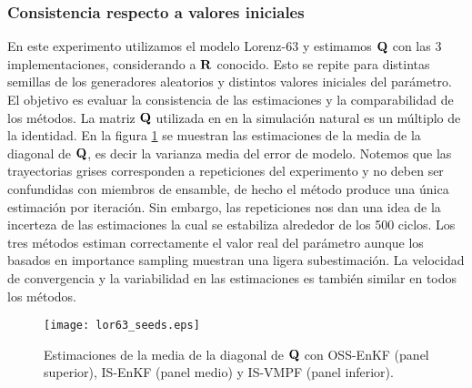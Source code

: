 \subsubsection{Consistencia respecto a valores iniciales}
En este experimento utilizamos el modelo Lorenz-63 y estimamos $\mathbf{Q}$ con las 3 implementaciones, considerando a $\mathbf{R}$ conocido. Esto se repite para distintas semillas de los generadores aleatorios y distintos valores iniciales del parámetro. El objetivo es evaluar la consistencia de las estimaciones y la comparabilidad de los métodos. La matriz $\mathbf{Q}$ utilizada en en la simulación natural es un múltiplo de la identidad. En la figura \ref{fig:lor63_seeds} se muestran las estimaciones de la media de la diagonal de $\mathbf{Q}$, es decir la varianza media del error de modelo. Notemos que las trayectorias grises corresponden a repeticiones del experimento y no deben ser confundidas con miembros de ensamble, de hecho el método produce una única estimación por iteración. Sin embargo, las repeticiones nos dan una idea de la incerteza de las estimaciones la cual se estabiliza alrededor de los 500 ciclos. Los tres métodos estiman correctamente el valor real del parámetro aunque los basados en importance sampling muestran una ligera subestimación. La velocidad de convergencia y la variabilidad en las estimaciones es también similar en todos los métodos.
\begin{figure}[h]
    \centering
    \texttt{[image: lor63\_seeds.eps]}
    \caption{Estimaciones de la media de la diagonal de $\mathbf{Q}$ con OSS-EnKF (panel superior), IS-EnKF (panel medio) y IS-VMPF (panel inferior).}
    \label{fig:lor63_seeds}
\end{figure}

